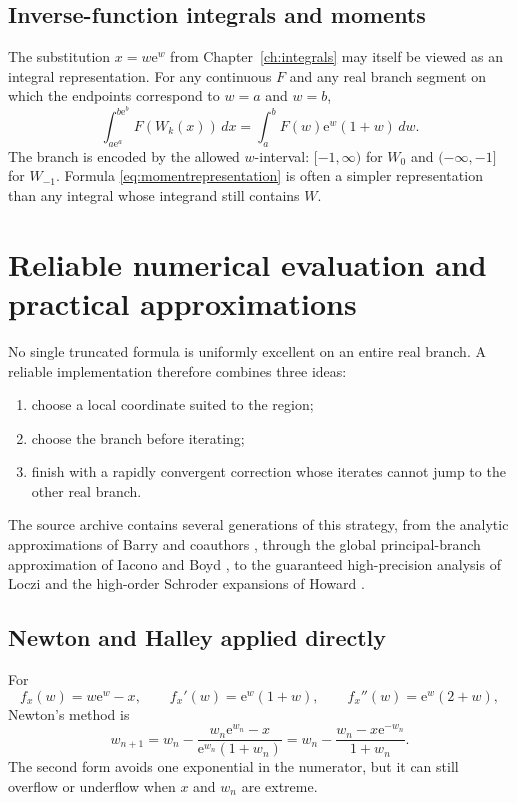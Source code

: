 \documentclass[11pt,oneside]{book}
\theoremstyle{definition}
\theoremstyle{remark}
\newcommand{\ee}{\mathrm e}
\begin{document}
\section{Inverse-function integrals and moments}

The substitution $x=w\ee^w$ from Chapter~\ref{ch:integrals} may itself be
viewed as an integral representation.  For any continuous $F$ and any real
branch segment on which the endpoints correspond to $w=a$ and $w=b$,
\begin{equation}\label{eq:momentrepresentation}
 \int_{a\ee^a}^{b\ee^b}F(W_k(x))\,dx
 =\int_a^b F(w)\ee^w(1+w)\,dw.
\end{equation}
The branch is encoded by the allowed $w$-interval: $[-1,\infty)$ for $W_0$
and $(-\infty,-1]$ for $W_{-1}$.  Formula
\eqref{eq:momentrepresentation} is often a simpler representation than any
integral whose integrand still contains $W$.


\chapter{Reliable numerical evaluation and practical approximations}
\label{ch:numerics}

No single truncated formula is uniformly excellent on an entire real branch.
A reliable implementation therefore combines three ideas:
\begin{enumerate}
\item choose a local coordinate suited to the region;
\item choose the branch before iterating;
\item finish with a rapidly convergent correction whose iterates cannot jump
to the other real branch.
\end{enumerate}
The source archive contains several generations of this strategy, from the
analytic approximations of Barry and coauthors \cite{barry2000}, through the
global principal-branch approximation of Iacono and Boyd
\cite{iacono2017}, to the guaranteed high-precision analysis of Loczi
\cite{loczi2022} and the high-order Schroder expansions of Howard
\cite{howard2025}.

\section{Newton and Halley applied directly}

For
\[
 f_x(w)=w\ee^w-x,
 \qquad
 f_x'(w)=\ee^w(1+w),
 \qquad
 f_x''(w)=\ee^w(2+w),
\]
Newton's method is
\begin{equation}\label{eq:directnewton}
 w_{n+1}
 =w_n-\frac{w_n\ee^{w_n}-x}{\ee^{w_n}(1+w_n)}
 =w_n-\frac{w_n-x\ee^{-w_n}}{1+w_n}.
\end{equation}
The second form avoids one exponential in the numerator, but it can still
overflow or underflow when $x$ and $w_n$ are extreme.
\end{document}
